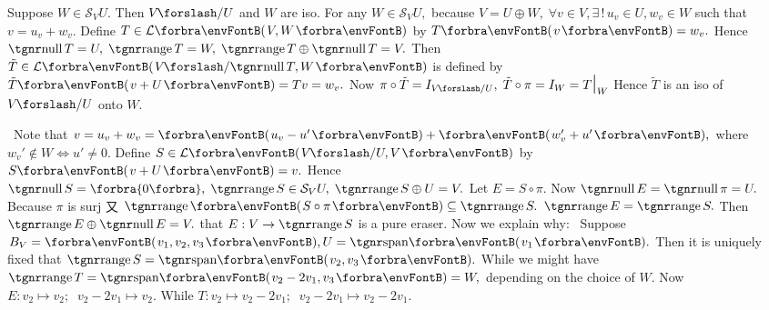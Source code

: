 \BulletPointX\NoteFor{[3.88, 3.90, 3.91]} {\vspace{2pt}Suppose $W\in\mathcal{S}_V U.$ Then $V\mySlash U$ and $W$ are iso.}\TextB{}
{\vspace{2pt}For any $W\in\mathcal{S}_V U,$ because $V=U\oplus W,\;\forall v\in V,\exists\,!\,u_v\in U,w_v\in W$ such that $v=u_v+w_v.$}\TextB{}
{\vspace{2pt}Define $T\in\Lm{V,W}$ by $T\Par{v}=w_v.$ Hence $\null T=U,\;\range T=W,\;\range T\oplus\null T=V.$}\TextB{}
{\vspace{2pt}Then $\tilde{T}\in\Lm{V\mySlash \null T,W}$ is defined by $\tilde{T}\Par{v+U}=Tv=w_v.$}\TextB{}
{\vspace{2pt}Now $\pi\circ\tilde{T}=I_{V\mySlash U},\;\tilde{T}\circ\pi=I_{W}=T\mmid_W$ Hence $\tilde{T}$ is an iso of $V\mySlash U$ onto $W.$}\par
{\vspace{2pt}\BulletPointX\Comment \,\,\,Note that $v=u_v+w_v=\Par{u_v-u'}+\Par{w_v'+u'},$ where $w_v'\not\in W\Longleftrightarrow u'\neq 0.$}\TextB{}
{\vspace{2pt}Define $S\in\Lm{V\mySlash U,V}$ by $S\Par{v+U}=v.$ Hence $\null S=\zeroSubs,\;\range S\in\mathcal{S}_V U,\;\range S\oplus U=V.$}\TextB{}
{\vspace{2pt}Let $E=S\circ\pi.$ Now $\null E=\null\pi=U.$ Because $\pi$ is surj 又 $\range\Par{S\circ\pi}\subseteq\range S.$ $\range E=\range S.$}\TextB{}
{\vspace{2pt}Then $\range E\oplus\null E=V.$ \NOTICE that $E:V\rightarrow\range S$ is a pure {\tgsl eraser}. Now we explain why:}\TextB{}
{\vspace{2pt}\Example \,\,\,Suppose $B_V=\Par{v_1,v_2,v_3},U=\Span{v_1}.$ Then it is uniquely fixed that $\range S=\Span{v_2,v_3}.$}\TextB{}
{\vspace{2pt}While we might have $\range T=\Span{v_2-2v_1,v_3}=W,$ depending on the choice of $W.$}\TextB{}
{Now $E:v_2\mapsto v_2;\;\;v_2-2v_1\mapsto v_2.$ While $T:v_2\mapsto v_2-2v_1;\;\;v_2-2v_1\mapsto v_2-2v_1.$}
\SepLine

